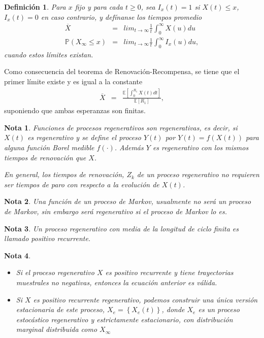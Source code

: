 \documentclass{article}
\newtheorem{Def}{Definición}
\newtheorem{Note}{Nota}
\newcommand{\esp}{\mathbb{E}}
\newcommand{\prob}{\mathbb{P}}
\begin{document}
\begin{Def}
Para $x$ fijo y para cada $t\geq0$, sea $I_{x}\left(t\right)=1$ si $X\left(t\right)\leq x$,  $I_{x}\left(t\right)=0$ en caso contrario, y def\'inanse los tiempos promedio
\begin{eqnarray*}
\overline{X}&=&lim_{t\rightarrow\infty}\frac{1}{t}\int_{0}^{\infty}X\left(u\right)du\\
\prob\left(X_{\infty}\leq x\right)&=&lim_{t\rightarrow\infty}\frac{1}{t}\int_{0}^{\infty}I_{x}\left(u\right)du,
\end{eqnarray*}
cuando estos l\'imites existan.
\end{Def}

Como consecuencia del teorema de Renovaci\'on-Recompensa, se tiene que el primer l\'imite  existe y es igual a la constante
\begin{eqnarray*}
\overline{X}&=&\frac{\esp\left[\int_{0}^{R_{1}}X\left(t\right)dt\right]}{\esp\left[R_{1}\right]},
\end{eqnarray*}
suponiendo que ambas esperanzas son finitas.
 
\begin{Note}
Funciones de procesos regenerativos son regenerativas, es decir, si $X\left(t\right)$ es regenerativo y se define el proceso $Y\left(t\right)$ por $Y\left(t\right)=f\left(X\left(t\right)\right)$ para alguna funci\'on Borel medible $f\left(\cdot\right)$. Adem\'as $Y$ es regenerativo con los mismos tiempos de renovaci\'on que $X$. 

En general, los tiempos de renovaci\'on, $Z_{k}$ de un proceso regenerativo no requieren ser tiempos de paro con respecto a la evoluci\'on de $X\left(t\right)$.
\end{Note} 

\begin{Note}
Una funci\'on de un proceso de Markov, usualmente no ser\'a un proceso de Markov, sin embargo ser\'a regenerativo si el proceso de Markov lo es.
\end{Note}

 
\begin{Note}
Un proceso regenerativo con media de la longitud de ciclo finita es llamado positivo recurrente.
\end{Note}


\begin{Note}
\begin{itemize}
\item[a)] Si el proceso regenerativo $X$ es positivo recurrente y tiene trayectorias muestrales no negativas, entonces la ecuaci\'on anterior es v\'alida.
\item[b)] Si $X$ es positivo recurrente regenerativo, podemos construir una \'unica versi\'on estacionaria de este proceso, $X_{e}=\left\{X_{e}\left(t\right)\right\}$, donde $X_{e}$ es un proceso estoc\'astico regenerativo y estrictamente estacionario, con distribuci\'on marginal distribuida como $X_{\infty}$
\end{itemize}
\end{Note}
\end{document}

